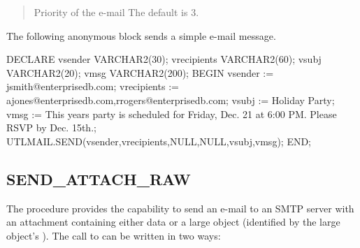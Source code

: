 \documentclass[letterpaper,10pt,english,openany,oneside]{sphinxmanual}
\begin{document}
\begin{quote}

Priority of the e-mail The default is 3.
\end{quote}


The following anonymous block sends a simple e-mail message.

%
\begin{sphinxVerbatim}[commandchars=\\\{\}]
DECLARE
    v\PYGZus{}sender        VARCHAR2(30);
    v\PYGZus{}recipients    VARCHAR2(60);
    v\PYGZus{}subj          VARCHAR2(20);
    v\PYGZus{}msg           VARCHAR2(200);
BEGIN
    v\PYGZus{}sender := \PYGZsq{}jsmith@enterprisedb.com\PYGZsq{};
    v\PYGZus{}recipients := \PYGZsq{}ajones@enterprisedb.com,rrogers@enterprisedb.com\PYGZsq{};
    v\PYGZus{}subj := \PYGZsq{}Holiday Party\PYGZsq{};
    v\PYGZus{}msg := \PYGZsq{}This year\PYGZsq{}\PYGZsq{}s party is scheduled for Friday, Dec. 21 at \PYGZsq{} \textbar{}\textbar{}
             \PYGZsq{}6:00 PM. Please RSVP by Dec. 15th.\PYGZsq{};
    UTL\PYGZus{}MAIL.SEND(v\PYGZus{}sender,v\PYGZus{}recipients,NULL,NULL,v\PYGZus{}subj,v\PYGZus{}msg);
END;
\end{sphinxVerbatim}

\newpage


\subsection{SEND\_ATTACH\_RAW}
\label{\detokenize{utl_mail:send-attach-raw}}
The  procedure provides the capability to send an
e-mail to an SMTP server with an attachment containing either  data
or a large object (identified by the large object’s ). The call to
 can be written in two ways:

\end{document}
